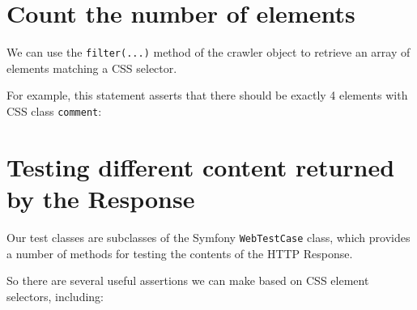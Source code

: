 \documentclass[a4paperpaper,openright]{book}
\newenvironment{Shaded}{}{}
\newcommand{\DecValTok}[1]{\textcolor[rgb]{0.25,0.63,0.44}{#1}}
\newcommand{\KeywordTok}[1]{\textcolor[rgb]{0.00,0.44,0.13}{\textbf{#1}}}
\newcommand{\NormalTok}[1]{#1}
\newcommand{\OtherTok}[1]{\textcolor[rgb]{0.00,0.44,0.13}{#1}}
\newcommand{\StringTok}[1]{\textcolor[rgb]{0.25,0.44,0.63}{#1}}
\begin{document}
\hypertarget{count-the-number-of-elements}{%
\section{Count the number of
elements}\label{count-the-number-of-elements}}

We can use the \texttt{filter(...)} method of the crawler object to
retrieve an array of elements matching a CSS selector.

For example, this statement asserts that there should be exactly 4
elements with CSS class \texttt{comment}:

\begin{Shaded}
\end{Shaded}

\hypertarget{testing-different-content-returned-by-the-response}{%
\section{Testing different content returned by the
Response}\label{testing-different-content-returned-by-the-response}}

Our test classes are subclasses of the Symfony \texttt{WebTestCase}
class, which provides a number of methods for testing the contents of
the HTTP Response.

So there are several useful assertions we can make based on CSS element
selectors, including:
\end{document}
